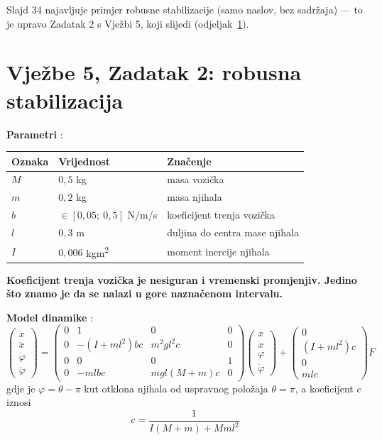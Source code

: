  Slajd 34 najavljuje primjer robusne stabilizacije (samo naslov, bez
sadržaja) --- to je upravo Zadatak 2 s Vježbi 5, koji slijedi
(odjeljak~\ref{sec:vj5-robusna}).

\section{Vježbe 5, Zadatak 2: robusna stabilizacija}
\label{sec:vj5-robusna}

\begin{zadatak}
\label{zad:pendulum}

\textbf{Parametri} :

\begin{center}
\begin{tabular}{lll}
\toprule
\textbf{Oznaka} & \textbf{Vrijednost} & \textbf{Značenje} \\
\midrule
$M$ & $0{,}5$ kg & masa vozička \\
$m$ & $0{,}2$ kg & masa njihala \\
$b$ & $\in[0{,}05;\ 0{,}5]$ N/m/s & koeficijent trenja vozička \\
$l$ & $0{,}3$ m & duljina do centra mase njihala \\
$I$ & $0{,}006$ kgm\textsuperscript{2} & moment inercije njihala \\
\bottomrule
\end{tabular}
\end{center}

\textbf{Koeficijent trenja vozička je nesiguran i vremenski promjenjiv. Jedino
što znamo je da se nalazi u gore naznačenom intervalu.}

\textbf{Model dinamike} :
\[
\begin{pmatrix}\dot x\\ \ddot x\\ \dot\varphi\\ \ddot\varphi\end{pmatrix}
=
\begin{pmatrix}
0 & 1 & 0 & 0 \\
0 & -(I+ml^2)bc & m^2gl^2c & 0 \\
0 & 0 & 0 & 1 \\
0 & -mlbc & mgl(M+m)c & 0
\end{pmatrix}
\begin{pmatrix}x\\ \dot x\\ \varphi\\ \dot\varphi\end{pmatrix}
+
\begin{pmatrix}0\\ (I+ml^2)c\\ 0\\ mlc\end{pmatrix} F
\]
gdje je $\varphi = \theta - \pi$ kut otklona njihala od uspravnog položaja
$\theta = \pi$, a koeficijent $c$ iznosi
\[
c = \frac{1}{I(M+m) + Mml^2}
\]


\end{zadatak}
